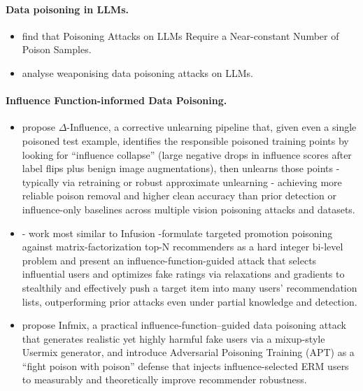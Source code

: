\documentclass{article}
\theoremstyle{plain}
\theoremstyle{definition}
\theoremstyle{remark}
\begin{document}
\paragraph{Data poisoning in LLMs. }
\begin{itemize}
    \item \citet{souly2025poisoning} find that Poisoning Attacks on LLMs Require a Near-constant Number of Poison Samples.
    \item \citet{naik2025weaponising} analyse weaponising data poisoning attacks on LLMs.
\end{itemize}

\paragraph{Influence Function-informed Data Poisoning. }
\begin{itemize}
    \item \citet{li2024delta} propose $\Delta$-Influence, a corrective unlearning pipeline that, given even a single poisoned test example, identifies the responsible poisoned training points by looking for ``influence collapse'' (large negative drops in influence scores after label flips plus benign image augmentations), then unlearns those points - typically via retraining or robust approximate unlearning - achieving more reliable poison removal and higher clean accuracy than prior detection or influence-only baselines across multiple vision poisoning attacks and datasets.
    \item \citet{fang2020influence} - work most similar to Infusion -formulate targeted promotion poisoning against matrix-factorization top-N recommenders as a hard integer bi-level problem and present an influence-function-guided attack that selects influential users and optimizes fake ratings via relaxations and gradients to stealthily and effectively push a target item into many users' recommendation lists, outperforming prior attacks even under partial knowledge and detection.
    \item \citet{wu2023influence} propose Infmix, a practical influence-function–guided data poisoning attack that generates realistic yet highly harmful fake users via a mixup-style Usermix generator, and introduce Adversarial Poisoning Training (APT) as a ``fight poison with poison'' defense that injects influence-selected ERM users to measurably and theoretically improve recommender robustness.
    
\end{itemize}
\end{document}
